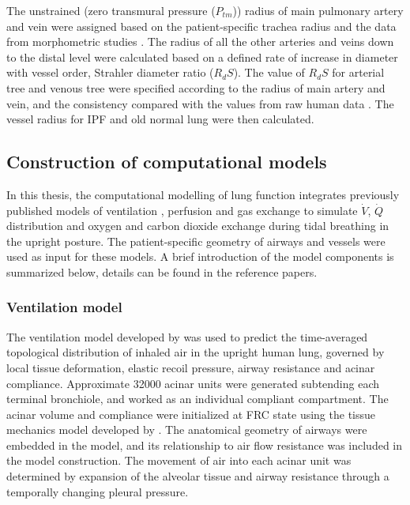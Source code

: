 The unstrained (zero transmural pressure ($P_{tm}$)) radius of main pulmonary artery and vein were assigned based on the patient-specific trachea radius and the data from morphometric studies \citep{horsfield1978morphometry,horsfield1981morphometry,huang1996morphometry}. The radius of all the other arteries and veins down to the distal level were calculated based on a defined rate of increase in diameter with vessel order, Strahler diameter ratio ($R_dS$). The value of $R_dS$ for arterial tree and venous tree were specified according to the radius of main artery and vein, and the consistency compared with the values from raw human data \citep{horsfield1978morphometry,horsfield1981morphometry,huang1996morphometry}. The vessel radius for IPF and old normal lung were then calculated. 
 
\subsection{Construction of computational models} \label{ComputationalModelConstruction}
In this thesis, the computational modelling of lung function integrates previously published models of ventilation \citep{swan2012computational}, perfusion \citep{clark2010contribution, clark2011interdependent} and gas exchange \citep{swan2010evidence} to simulate $\dot{V}$, $\dot{Q}$ distribution and oxygen and carbon dioxide exchange during tidal breathing in the upright posture. The patient-specific geometry of airways and vessels were used as input for these models. A brief introduction of the model components is summarized below, details can be found in the reference papers.

\subsubsection{Ventilation model}
The ventilation model developed by \cite{swan2012computational} was used to predict the time-averaged topological distribution of inhaled air in the upright human lung, governed by local tissue deformation, elastic recoil pressure, airway resistance and acinar compliance. Approximate 32000 acinar units were generated subtending each terminal bronchiole, and worked as an individual compliant compartment. The acinar volume and compliance were initialized at FRC state using the tissue mechanics model developed by \cite{tawhai2009supine}. The anatomical geometry of airways were embedded in the model, and its relationship to air flow resistance was included in the model construction. The movement of air into each acinar unit was determined by expansion of the alveolar tissue and airway resistance through a temporally changing pleural pressure.

